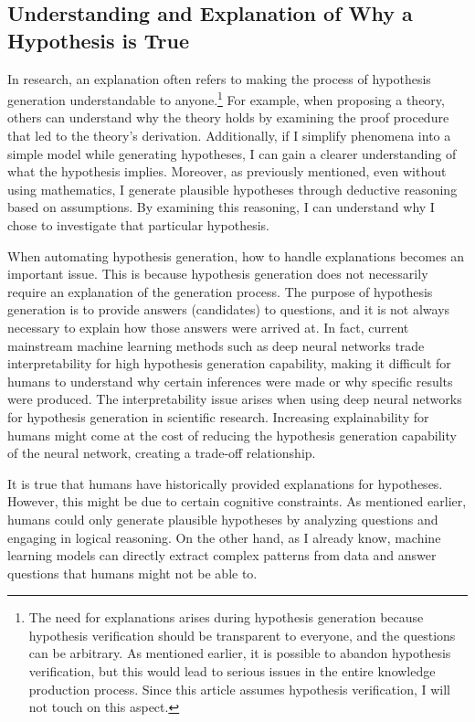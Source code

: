 
\subsection{Understanding and Explanation of Why a Hypothesis is True}
In research, an explanation often refers to making the process of hypothesis generation understandable to anyone.\footnote{
The need for explanations arises during hypothesis generation because hypothesis verification should be transparent to everyone, and the questions can be arbitrary. As mentioned earlier, it is possible to abandon hypothesis verification, but this would lead to serious issues in the entire knowledge production process. Since this article assumes hypothesis verification, I will not touch on this aspect.
} For example, when proposing a theory, others can understand why the theory holds by examining the proof procedure that led to the theory's derivation. Additionally, if I simplify phenomena into a simple model while generating hypotheses, I can gain a clearer understanding of what the hypothesis implies. Moreover, as previously mentioned, even without using mathematics, I generate plausible hypotheses through deductive reasoning based on assumptions. By examining this reasoning, I can understand why I chose to investigate that particular hypothesis.

When automating hypothesis generation, how to handle explanations becomes an important issue. This is because hypothesis generation does not necessarily require an explanation of the generation process. The purpose of hypothesis generation is to provide answers (candidates) to questions, and it is not always necessary to explain how those answers were arrived at. In fact, current mainstream machine learning methods such as deep neural networks trade interpretability for high hypothesis generation capability, making it difficult for humans to understand why certain inferences were made or why specific results were produced. The interpretability issue arises when using deep neural networks for hypothesis generation in scientific research. Increasing explainability for humans might come at the cost of reducing the hypothesis generation capability of the neural network, creating a trade-off relationship.

It is true that humans have historically provided explanations for hypotheses. However, this might be due to certain cognitive constraints. As mentioned earlier, humans could only generate plausible hypotheses by analyzing questions and engaging in logical reasoning. On the other hand, as I already know, machine learning models can directly extract complex patterns from data and answer questions that humans might not be able to.

